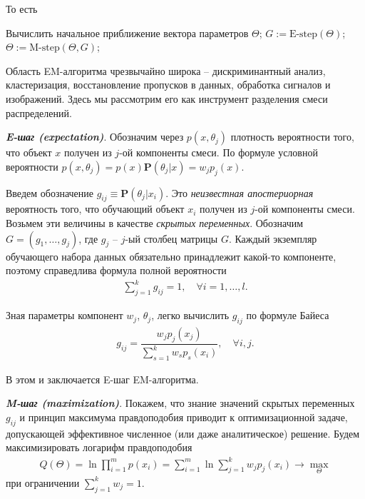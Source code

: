 \documentclass[%
	11pt,
	a4paper,
	utf8,
		]{article}
\begin{document}
То есть
\begin{algorithmic}[1]
	\STATE Вычислить начальное приближение вектора параметров $ \Theta $;
	\REPEAT
	    \STATE $ G := \text{E-step}(\Theta) $;
	    \STATE $ \Theta := \text{M-step}(\Theta, G) $;
\end{algorithmic}

Область EM-алгоритма чрезвычайно широка -- дискриминантный анализ, кластеризация, восстановление пропусков в данных, обработка сигналов и изображений. Здесь мы рассмотрим его как инструмент разделения смеси распределений.

\emph{\bfseries E-шаг (expectation)}. Обозначим через $ p(x, \theta_j) $ плотность вероятности того, что объект $ x $ получен из $ j $-ой компоненты смеси. По формуле условной вероятности $ p(x, \theta_j) = p(x) \mathbf{P}(\theta_j | x) = w_j p_j(x) $.

Введем обозначение $ g_{ij} \equiv \mathbf{P}(\theta_j | x_i) $. Это \emph{неизвестная апостериорная} вероятность того, что обучающий объект $ x_i $ получен из $ j $-ой компоненты смеси. Возьмем эти величины в качестве \emph{скрытых переменных}. Обозначим $ G = (g_1, \ldots, g_j) $, где $ g_j $ -- $ j $-ый столбец матрицы $ G $. Каждый экземпляр обучающего набора данных обязательно принадлежит какой-то компоненте, поэтому справедлива формула полной вероятности
\begin{align*}
	\sum_{j=1}^{k} g_{ij} = 1, \quad \forall i = 1, \ldots, l.
\end{align*}

Зная параметры компонент $ w_j $, $ \theta_j $, легко вычислить $ g_{ij} $ по формуле Байеса
\begin{align*}
	g_{ij} = \dfrac{ w_j p_j(x_j) }{ \sum_{s=1}^{k} w_s p_s(x_i) }, \quad \forall i, j.
\end{align*}

В этом и заключается E-шаг EM-алгоритма.

\emph{\bfseries M-шаг (maximization)}. Покажем, что знание значений скрытых переменных $ g_{ij} $ и принцип максимума правдоподобия приводит к оптимизационной задаче, допускающей эффективное численное (или даже аналитическое) решение. Будем максимизировать логарифм правдоподобия
\begin{align*}
	Q(\Theta) = \ln \prod_{i=1}^{m} p(x_i) = \sum_{i=1}^{m} \ln \sum_{j=1}^{k} w_j p_j(x_i) \to \underset{\Theta}{\max}
\end{align*}
при ограничении $ \sum\limits_{j=1}^{k} w_j = 1 $.
\end{document}
